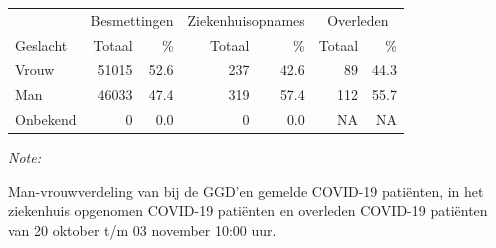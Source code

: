 \documentclass[
  english,
  man,floatsintext]{apa6}
\begin{document}
\begin{table}
\centering\begingroup\fontsize{11}{13}\selectfont

\begin{threeparttable}
\begin{tabular}{lrrrrrr}
\toprule
\multicolumn{1}{c}{ } & \multicolumn{2}{c}{Besmettingen} & \multicolumn{2}{c}{Ziekenhuisopnames} & \multicolumn{2}{c}{Overleden} \\
\cmidrule(l{3pt}r{3pt}){2-3} \cmidrule(l{3pt}r{3pt}){4-5} \cmidrule(l{3pt}r{3pt}){6-7}
Geslacht & Totaal & \% & Totaal & \% & Totaal & \%\\
\midrule
Vrouw & 51015 & 52.6 & 237 & 42.6 & 89 & 44.3\\
Man & 46033 & 47.4 & 319 & 57.4 & 112 & 55.7\\
Onbekend & 0 & 0.0 & 0 & 0.0 & NA & NA\\
\bottomrule
\end{tabular}
\begin{tablenotes}
\item \textit{Note: } 
\item Man-vrouwverdeling van bij de GGD’en gemelde COVID-19 patiënten, in het ziekenhuis opgenomen COVID-19 patiënten en overleden COVID-19 patiënten van 20 oktober t/m 03 november 10:00 uur.
\end{tablenotes}
\end{threeparttable}
\endgroup{}
\end{table}
\newpage
\end{document}
